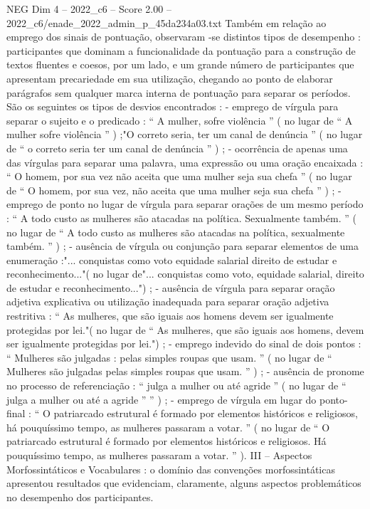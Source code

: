 \begin{textsample}{NEG Dim 4 – 2022\_c6 – Score 2.00 – 2022\_c6/enade\_2022\_admin\_p\_45da234a03.txt}
Também em relação ao emprego dos sinais de pontuação, observaram -se distintos tipos de desempenho : participantes que dominam a funcionalidade da pontuação para a construção de textos fluentes e coesos, por um lado, e um grande número de participantes que apresentam precariedade em sua utilização, chegando ao ponto de elaborar parágrafos sem qualquer marca interna de pontuação para separar os períodos.
São os seguintes os tipos de desvios encontrados : - emprego de vírgula para separar o sujeito e o predicado : “ A mulher, sofre violência ” ( no lugar de “ A mulher sofre violência ” ) ;"O correto seria, ter um canal de denúncia ” ( no lugar de “ o correto seria ter um canal de denúncia ” ) ; - ocorrência de apenas uma das vírgulas para separar uma palavra, uma expressão ou uma oração encaixada : “ O homem, por sua vez não aceita que uma mulher seja sua chefa ” ( no lugar de “ O homem, por sua vez, não aceita que uma mulher seja sua chefa ” ) ; - emprego de ponto no lugar de vírgula para separar orações de um mesmo período : “ A todo custo as mulheres são atacadas na política.
Sexualmente também. ” ( no lugar de “ A todo custo as mulheres são atacadas na política, sexualmente também. ” ) ; - ausência de vírgula ou conjunção para separar elementos de uma enumeração :"... conquistas como voto equidade salarial direito de estudar e reconhecimento..."( no lugar de"... conquistas como voto, equidade salarial, direito de estudar e reconhecimento...") ; - ausência de vírgula para separar oração adjetiva explicativa ou utilização inadequada para separar oração adjetiva restritiva : “ As mulheres, que são iguais aos homens devem ser igualmente protegidas por lei."( no lugar de “ As mulheres, que são iguais aos homens, devem ser igualmente protegidas por lei.") ; - emprego indevido do sinal de dois pontos : “ Mulheres são julgadas : pelas simples roupas que usam. ” ( no lugar de “ Mulheres são julgadas pelas simples roupas que usam. ” ) ; - ausência de pronome no processo de referenciação : “ julga a mulher ou até agride ” ( no lugar de “ julga a mulher ou até a agride ” ” ) ; - emprego de vírgula em lugar do ponto-final : “ O patriarcado estrutural é formado por elementos históricos e religiosos, há pouquíssimo tempo, as mulheres passaram a votar. ” ( no lugar de “ O patriarcado estrutural é formado por elementos históricos e religiosos.
Há pouquíssimo tempo, as mulheres passaram a votar. ” ).
III – Aspectos Morfossintáticos e Vocabulares : o domínio das convenções morfossintáticas apresentou resultados que evidenciam, claramente, alguns aspectos problemáticos no desempenho dos participantes.

\end{textsample}
